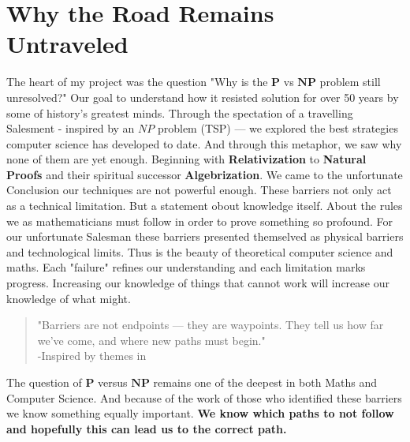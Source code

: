 \documentclass[12pt]{report}
\begin{document}
\section{Why the Road Remains Untraveled}
The heart of my project was the question "Why is the $\mathbf{P}$ vs $\mathbf{NP}$ problem still unresolved?"
Our goal to understand how it resisted solution for over 50 years by some of history's greatest minds.
Through the spectation of a travelling Salesment - inspired by an $NP$ problem (TSP) --- we explored the best strategies computer science has developed to date.
And through this metaphor, we saw why none of them are yet enough.
Beginning with \textbf{Relativization} to \textbf{Natural Proofs} and their spiritual successor \textbf{Algebrization}.
We came to the unfortunate Conclusion our techniques are not powerful enough.
These barriers not only act as a technical limitation.
But a statement obout knowledge itself.
About the rules we as mathematicians must follow in order to prove something so profound.
For our unfortunate Salesman these barriers presented themselved as physical barriers and technological limits.
Thus is the beauty of theoretical computer science and maths.
Each "failure" refines our understanding and each limitation marks progress.
Increasing our knowledge of things that cannot work will increase our knowledge of what might.
\begin{quote}
    "Barriers are not endpoints --- they are waypoints. They tell us how far we've come, and where new paths must begin."\\
    -Inspired by themes in \cite{arora2009}
\end{quote}
The question of $\mathbf{P}$ versus $\mathbf{NP}$ remains one of the deepest in both Maths and Computer Science.
And because of the work of those who identified these barriers we know something equally important.
\textbf{We know which paths to not follow and hopefully this can lead us to the correct path.}



\end{document}
